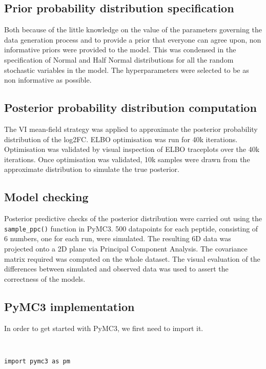 \subsection{Prior probability distribution specification}

Both because of the little knowledge on the value of the parameters governing the data generation process and to provide a prior that everyone can agree upon, non informative priors were provided to the model. This was condensed in the specification of Normal and Half Normal distributions for all the random stochastic variables in the model. The hyperparameters were selected to be as non informative as possible.

\subsection{Posterior probability distribution computation}
\label{subsec:posterior_compute}

The \ac{VI} mean-field strategy was applied to approximate the posterior probability distribution of the \ac{log2FC}. \ac{ELBO} optimisation was run for 40k iterations. Optimisation was validated by visual inspection of \ac{ELBO} traceplots over the 40k iterations. Once optimisation was validated, 10k samples were drawn from the approximate distribution to simulate the true posterior.

\subsection{Model checking}

Posterior predictive checks of the posterior distribution were carried out using the \texttt{sample\_ppc()} function in PyMC3. 500 datapoints for each peptide, consisting of 6 numbers, one for each run, were simulated. The resulting 6D data was projected onto a 2D plane via Principal Component Analysis. The covariance matrix required was computed on the whole dataset. The visual evaluation of the differences between simulated and observed data was used to assert the correctness of the models.

\subsection{PyMC3 implementation}

In order to get started with PyMC3, we first need to import it.

\begin{verbatim}


import pymc3 as pm              
\end{verbatim}

